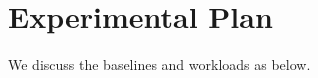 
\section{Experimental Plan}
\label{sec:txn:exp}
We discuss the baselines and workloads as below. 

